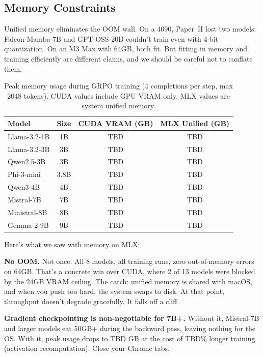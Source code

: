 \documentclass[11pt]{article}
\begin{document}
\subsection{Memory Constraints}
\label{sec:memory}

Unified memory eliminates the OOM wall.  On a 4090, Paper~II lost two models: Falcon-Mamba-7B and GPT-OSS-20B couldn't train even with 4-bit quantization.  On an M3 Max with 64GB, both fit.  But fitting in memory and training efficiently are different claims, and we should be careful not to conflate them.

\begin{table}[t]
\centering
\caption{Peak memory usage during GRPO training (4 completions per step, max 2048 tokens). CUDA values include GPU VRAM only.  MLX values are system unified memory.}
\label{tab:memory}
\begin{tabular}{lc cc}
\toprule
\textbf{Model} & \textbf{Size} & \textbf{CUDA VRAM (GB)} & \textbf{MLX Unified (GB)} \\
\midrule
Llama-3.2-1B & 1B & TBD & TBD \\
Llama-3.2-3B & 3B & TBD & TBD \\
Qwen2.5-3B & 3B & TBD & TBD \\
Phi-3-mini & 3.8B & TBD & TBD \\
Qwen3-4B & 4B & TBD & TBD \\
Mistral-7B & 7B & TBD & TBD \\
Ministral-8B & 8B & TBD & TBD \\
Gemma-2-9B & 9B & TBD & TBD \\
\bottomrule
\end{tabular}
\end{table}

Here's what we saw with memory on MLX:

\textbf{No OOM.}  Not once.  All 8 models, all training runs, zero out-of-memory errors on 64GB.  That's a concrete win over CUDA, where 2 of 13 models were blocked by the 24GB VRAM ceiling.  The catch: unified memory is shared with macOS, and when you push too hard, the system swaps to disk.  At that point, throughput doesn't degrade gracefully.  It falls off a cliff.

\textbf{Gradient checkpointing is non-negotiable for 7B+.}  Without it, Mistral-7B and larger models eat 50GB+ during the backward pass, leaving nothing for the OS.  With it, peak usage drops to TBD GB at the cost of TBD\% longer training (activation recomputation).  Close your Chrome tabs.
\end{document}
